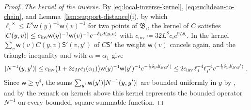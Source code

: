 \documentclass[11pt]{preprint}
\DeclarePairedDelimiter{\abs}{\lvert}{\rvert}
\numberwithin{equation}{section}
\theoremstyle{definition}
\theoremstyle{remark}
\theoremstyle{plain}
\begin{document}
\begin{proof}
\emph{The kernel of the inverse.} By \eqref{eq:local-inverse-kernel}, \eqref{eq:euclidean-to-chain}, and Lemma~\ref{lem:support-distance}(i), by which $\ell_\square^{-8} \leq L^8\mathsf w(y)^{-1}\mathsf w(v)^{-1}$ for two points of $\mathfrak B_\square$, the kernel of $C$ satisfies $\abs{C(y, v)} \leq c_{\mathrm{inv}}\mathsf w(y)^{-1}\mathsf w(v)^{-1}e^{-\delta_1d(y, v)}$ with $c_{\mathrm{inv}} \coloneqq 32L^8c_\square e^{9L\theta_\square}$. In the kernel $\sum_v\mathsf w(v)C(y, v)\mathsf S'(v, y')$ of $C\mathsf S'$ the weight $\mathsf w(v)$ cancels again, and the triangle inequality and \cite[(2.61)]{BalabanPRT2} with $\alpha = \alpha_1$ give
\begin{equation}\label{eq:inverse-kernel}
    \abs{N^{-1}(y, y')} \leq c_{\mathrm{inv}}\bigl(1 + 2\varepsilon_Mc_1(\alpha_1)\bigr)\mathsf w(y)^{-1}\mathsf w(y')^{-1}e^{-\frac12\delta_1d(y, y')} \leq 2c_{\mathrm{inv}}\,\ell_j^{-4}\ell_{j'}^{-4}e^{-\frac12\delta_1d(y, y')}\;.
\end{equation}
Since $\mathsf w \geq \eta^4$, the sums $\sum_{y'}\mathsf w(y')\abs{N^{-1}(y, y')}$ are bounded uniformly in $y$ by \cite[(2.61)]{BalabanPRT2}, and by the remark on kernels above this kernel represents the bounded operator $N^{-1}$ on every bounded, square-summable function.


\end{proof}
\end{document}
